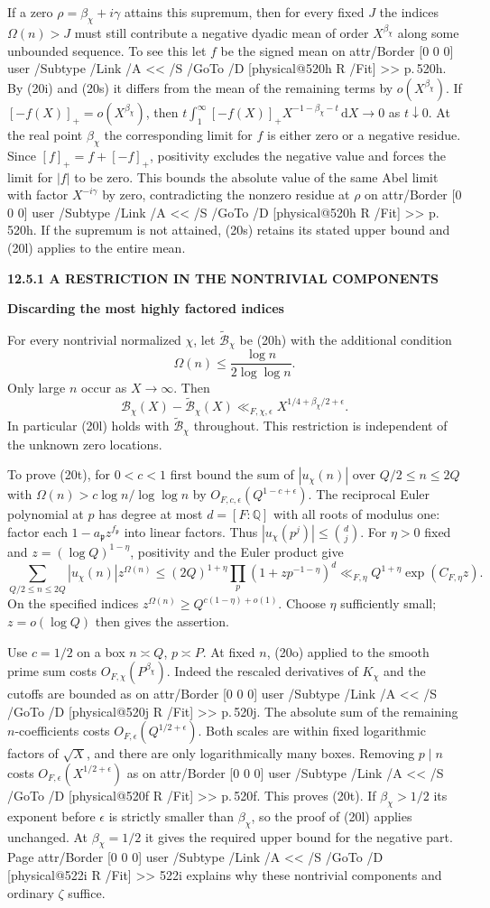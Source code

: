 \documentclass[11pt,letterpaper]{article}
\makeatletter
\newcommand{\rightmarktext}{}
\newcommand{\printfolio}{}
\newcommand{\leaf}[4]{\clearpage\gdef\printfolio{#1}\gdef\rightmarktext{#2}%
  {\small\sffamily\bfseries\color{ink}#3\par}\vspace{3pt}%
  {\LARGE\bfseries #4\par}\vspace{5pt}}
\newcommand{\Q}{\mathbb Q}
\newcommand{\dd}{\,\mathrm d}
\newcommand{\MusicPDFPageRef}[1]{\pdfpageref\csname physical@#1\endcsname\space\space 0 R}
\newcommand{\pagelink}[2]{\leavevmode\pdfstartlink attr{/Border [0 0 0]} user{%
  /Subtype /Link /A << /S /GoTo /D [\MusicPDFPageRef{#1} /Fit] >>}%
  {\color{ink}#2}\pdfendlink}
\newcommand{\pg}[1]{\pagelink{#1}{p.\,#1}}
\makeatother
\begin{document}
If a zero $\rho=\beta_\chi+i\gamma$ attains this supremum, then for
every fixed $J$ the indices $\Omega(n)>J$ must still contribute a
negative dyadic mean of order $X^{\beta_\chi}$ along some unbounded
sequence. To see this let $f$ be the signed mean on \pg{520h}.
By (20i) and (20s) it differs from the mean of the remaining terms by
$o(X^{\beta_\chi})$. If $[-f(X)]_+=o(X^{\beta_\chi})$, then
$t\int_1^\infty[-f(X)]_+X^{-1-\beta_\chi-t}\dd X\to0$ as $t\downarrow0$.
At the real point $\beta_\chi$ the corresponding limit for $f$ is
either zero or a negative residue. Since $[f]_+=f+[-f]_+$, positivity
excludes the negative value and forces the limit for $|f|$ to be zero.
This bounds the absolute value of the same Abel limit with factor
$X^{-i\gamma}$ by zero, contradicting the nonzero residue at $\rho$
on \pg{520h}. If the supremum is not attained, (20s) retains its stated
upper bound and (20l) applies to the entire mean.

\leaf{520n}{Integers with many prime factors}{12.5.1 \quad A RESTRICTION IN THE NONTRIVIAL COMPONENTS}{Discarding the most highly factored indices}
For every nontrivial normalized $\chi$, let $\widetilde{\mathcal B}_\chi$
be (20h) with the additional condition
\[
             \Omega(n)\le \frac{\log n}{2\log\log n}.
\]
Only large $n$ occur as $X\to\infty$. Then
\[
     \mathcal B_\chi(X)-\widetilde{\mathcal B}_\chi(X)
             \ll_{F,\chi,\epsilon} X^{1/4+\beta_\chi/2+\epsilon}.
 \tag{20t}
\]
In particular (20l) holds with $\widetilde{\mathcal B}_\chi$ throughout.
This restriction is independent of the unknown zero locations.

To prove (20t), for $0<c<1$ first bound the sum of $|u_\chi(n)|$ over
$Q/2\le n\le2Q$ with $\Omega(n)>c\log n/\log\log n$ by
$O_{F,c,\epsilon}(Q^{1-c+\epsilon})$. The reciprocal Euler polynomial
at $p$ has degree at most $d=[F:\Q]$ with all roots of modulus one:
factor each $1-a_{\mathfrak p}z^{f_{\mathfrak p}}$ into linear factors.
Thus $|u_\chi(p^j)|\le\binom dj$. For $\eta>0$ fixed and
$z=(\log Q)^{1-\eta}$, positivity and the Euler product give
\[
   \sum_{Q/2\le n\le2Q}|u_\chi(n)|z^{\Omega(n)}
     \le (2Q)^{1+\eta}\prod_p(1+zp^{-1-\eta})^d
     \ll_{F,\eta}Q^{1+\eta}\exp(C_{F,\eta}z).
\]
On the specified indices $z^{\Omega(n)}\ge
Q^{c(1-\eta)+o(1)}$. Choose $\eta$ sufficiently small; $z=o(\log Q)$
then gives the assertion.

Use $c=1/2$ on a box $n\asymp Q$, $p\asymp P$. At fixed $n$, (20o)
applied to the smooth prime sum costs $O_{F,\chi}(P^{\beta_\chi})$.
Indeed the rescaled derivatives of $K_\chi$ and the cutoffs are bounded
as on \pg{520j}. The absolute sum of the remaining $n$-coefficients
costs $O_{F,\epsilon}(Q^{1/2+\epsilon})$. Both scales are within fixed
logarithmic factors of $\sqrt X$, and there are only logarithmically
many boxes. Removing $p\mid n$ costs $O_{F,\epsilon}(X^{1/2+\epsilon})$
as on \pg{520f}. This proves (20t). If $\beta_\chi>1/2$ its exponent
before $\epsilon$ is strictly smaller than $\beta_\chi$, so the proof
of (20l) applies unchanged. At $\beta_\chi=1/2$ it gives the required
upper bound for the negative part. Page \pagelink{522i}{522i} explains
why these nontrivial components and ordinary $\zeta$ suffice.
\end{document}
